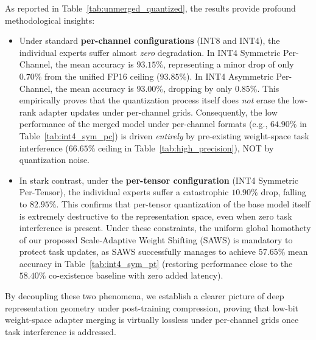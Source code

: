 As reported in Table~\ref{tab:unmerged_quantized}, the results provide profound methodological insights:
\begin{itemize}
  \item Under standard \textbf{per-channel configurations} (INT8 and INT4), the individual experts suffer almost \emph{zero} degradation. In INT4 Symmetric Per-Channel, the mean accuracy is $93.15\%$, representing a minor drop of only $0.70\%$ from the unified FP16 ceiling ($93.85\%$). In INT4 Asymmetric Per-Channel, the mean accuracy is $93.00\%$, dropping by only $0.85\%$. This empirically proves that the quantization process itself does \emph{not} erase the low-rank adapter updates under per-channel grids. Consequently, the low performance of the merged model under per-channel formats (e.g., $64.90\%$ in Table~\ref{tab:int4_sym_pc}) is driven \emph{entirely} by pre-existing weight-space task interference ($66.65\%$ ceiling in Table~\ref{tab:high_precision}), NOT by quantization noise.
  \item In stark contrast, under the \textbf{per-tensor configuration} (INT4 Symmetric Per-Tensor), the individual experts suffer a catastrophic \textbf{$10.90\%$} drop, falling to $82.95\%$. This confirms that per-tensor quantization of the base model itself is extremely destructive to the representation space, even when zero task interference is present. Under these constraints, the uniform global homothety of our proposed Scale-Adaptive Weight Shifting (SAWS) is mandatory to protect task updates, as SAWS successfully manages to achieve $57.65\%$ mean accuracy in Table~\ref{tab:int4_sym_pt} (restoring performance close to the $58.40\%$ co-existence baseline with zero added latency).
\end{itemize}
By decoupling these two phenomena, we establish a clearer picture of deep representation geometry under post-training compression, proving that low-bit weight-space adapter merging is virtually lossless under per-channel grids once task interference is addressed.